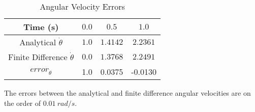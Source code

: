\begin{parts}
    \begin{table}[h!]
        \centering
        \caption{Angular Velocity Errors}
        \def\arraystretch{1.5}
        \begin{tabular}{|c|c|c|c|}
            \hline
            Time (s)                         & $0.0$ & $0.5$    & $1.0$    \\
            \hline
            Analytical $\dot{\theta}$        & $1.0$ & $1.4142$ & $2.2361$ \\
            \hline
            Finite Difference $\dot{\theta}$ & $0.0$ & $1.3768$ & $2.2491$ \\
            \hline
            $error_{\dot{\theta}}$           & 1.0   & 0.0375   & -0.0130  \\
            \hline
        \end{tabular}
        \label{tbl:errors}
    \end{table}

    The errors between the analytical and finite difference angular velocities are on the order of $0.01~\unit{rad/s}$.

\end{parts}